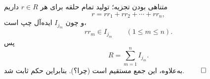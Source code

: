 \begin{frame}[t]{متناهی بودن تجزیه؛ تولید تمام حلقه}
    \label{lec06:finite-decomposition-conclusion}
    برای هر \(r\in R\) داریم
    \[
        r=rr_1+rr_2+\cdots+rr_n,
    \]
    و چون \(I_{j_m}\) ایده‌آل چپ است،
    \[
        rr_m\in I_{j_m}\qquad(1\leqslant m\leqslant n).
    \]
    پس
    \[
        R=\sum_{m=1}^{n}I_{j_m}.
    \]
    به‌علاوه، این جمع مستقیم است (چرا؟). بنابراین حکم ثابت شد.
    \hfill\(\qed\)
\end{frame}
